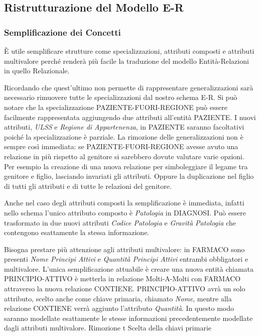 \documentclass{article}
\begin{document}

\subsection{Ristrutturazione del Modello E-R}
\subsubsection{Semplificazione dei Concetti}

È utile semplificare strutture come specializzazioni, attributi composti e
attributi multivalore perché renderà più facile la traduzione del modello
Entità-Relazioni in quello Relazionale.

Ricordando che quest'ultimo non permette di rappresentare generalizzazioni sarà
necessario rimuovere tutte le specializzazioni dal nostro schema E-R.  Si può
notare che la specializzazione PAZIENTE-FUORI-REGIONE può essere facilmente
rappresentata aggiungendo due attributi all'entità PAZIENTE.  I nuovi
attributi, \textit{ULSS} e \textit{Regione di Appartenenza}, in PAZIENTE
saranno facoltativi poiché la specializzazione è parziale.  La rimozione delle
generalizzazioni non è sempre così immediata: se PAZIENTE-FUORI-REGIONE avesse
avuto una relazione in più rispetto al genitore si sarebbero dovute valutare
varie opzioni.  Per esempio la creazione di una nuova relazione per
simboleggiare il legame tra genitore e figlio, lasciando invariati gli
attributi.  Oppure la duplicazione nel figlio di tutti gli attributi e di tutte
le relazioni del genitore.  

Anche nel caso degli attributi composti la semplificazione è immediata, infatti
nello schema l'unico attributo composto è \textit{Patologia} in DIAGNOSI.  Può
essere trasformato in due nuovi attributi \textit{Codice Patologia} e
\textit{Gravità Patologia} che contengono esattamente la stessa informazione.

Bisogna prestare più attenzione agli attributi multivalore: in FARMACO sono
presenti \textit{Nome Principi Attivi} e \textit{Quantità Principi Attivi}
entrambi obbligatori e multivalore.  L'unica semplificazione attuabile è creare
una nuova entità chiamata PRINCIPIO-ATTIVO è metterla in relazione
Molti-A-Molti con FARMACO attraverso la nuova relazione CONTIENE.
PRINCIPIO-ATTIVO avrà un solo attributo, scelto anche come chiave primaria,
chiamato \textit{Nome}, mentre alla relazione CONTIENE verrà aggiunto
l'attributo \textit{Quantità}.  In questo modo saranno modellate esattamente le
stesse informazioni precedentemente modellate dagli attributi multivalore.
Rimozione t Scelta della chiavi primarie
\end{document}
